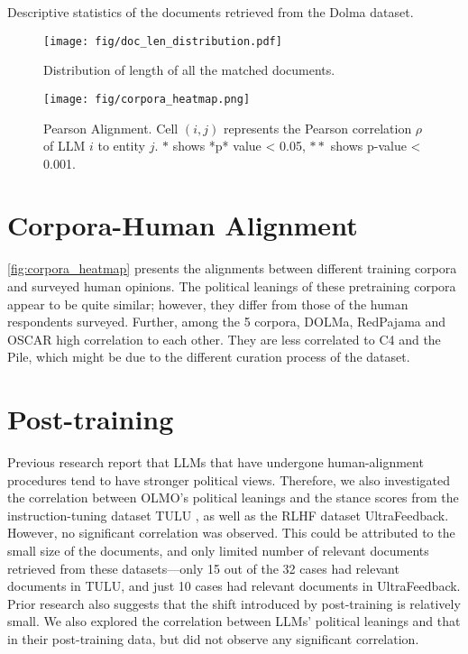 


\begin{table*}[h]
    \caption{Descriptive statistics of the documents retrieved from the Dolma dataset.}
    \label{tab:stance_stats}

\end{table*}






\begin{figure*}[]
\centering
\texttt{[image: fig/doc\_len\_distribution.pdf]}
\caption{Distribution of length of all the matched documents.}
\label{fig:doc_len_distribution}
\end{figure*}


\begin{figure*}[]
\centering
\texttt{[image: fig/corpora\_heatmap.png]}
\caption{Pearson Alignment. Cell $(i, j)$ represents the Pearson correlation $\rho$ of LLM $i$ to entity $j$. $*$ shows *p* value < 0.05, $**$ shows p-value < 0.001. }
\label{fig:corpora_heatmap}
\end{figure*}

\section{Corpora-Human Alignment}
\label{app:corpora_human}
\autoref{fig:corpora_heatmap} presents the alignments between different training corpora and surveyed human opinions. The political leanings of these pretraining corpora appear to be quite similar; however, they differ from those of the human respondents surveyed. Further, among the 5 corpora, DOLMa, RedPajama and OSCAR high correlation to each other. They are less correlated to C4 and the Pile, which might be due to the different curation process of the dataset.


\section{Post-training}
\label{app:post-training}

Previous research report that LLMs that have undergone human-alignment procedures tend to have stronger political views\cite{santurkar2023whose,perez-etal-2023-discovering}. Therefore, we also investigated the correlation between OLMO’s political leanings and the stance scores from the instruction-tuning dataset TULU , as well as the RLHF dataset UltraFeedback. However, no significant correlation was observed. This could be attributed to the small size of the documents, and only limited number of relevant documents retrieved from these datasets—only 15 out of the 32 cases had relevant documents in TULU, and just 10 cases had relevant documents in UltraFeedback. Prior research \cite{feng-etal-2023-pretraining} also suggests that the shift introduced by post-training is relatively small. We also explored the correlation between LLMs' political leanings and that in their post-training data, but did not observe any significant correlation. 

